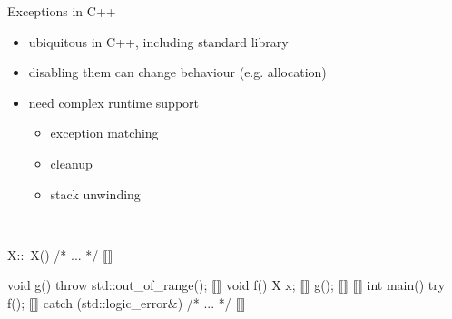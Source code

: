\documentclass[aspectratio=169, fi]{paradise-slide}
\begin{document}
\newcommand{\arr}[1]{\visible<#1>{\textcolor{red}{$\mathbf{\longleftarrow}$}}}
\begin{frame}[fragile]{Exceptions in C++}
  \begin{minipage}{0.47\textwidth}
    \setlength{\leftmargini}{1em}
    \begin{itemize}
      \item ubiquitous in C++, including standard library
      \item disabling them can change behaviour (e.g. allocation)
      \item need complex runtime support
        \begin{itemize}
          \item exception matching
          \item cleanup
          \item stack unwinding
        \end{itemize}
    \end{itemize}

    \bigskip
    \medskip\\
  \end{minipage}
  \hfill
  \pause
  \begin{minipage}{0.47\textwidth}
    \begin{cppcodeln}
      X::~X() { /* ... */ } ⟦\arr{7}⟧

      void g() {
        throw std::out_of_range(); ⟦\arr{5}⟧
      }
      void f() {
        X x; ⟦\arr{3}⟧
        g(); ⟦\arr{4}⟧
      } ⟦\arr{6}⟧
      int main() {
        try {
          f(); ⟦\arr{2}⟧
        } catch (std::logic_error&) {
          /* ... */ ⟦\arr{8}⟧
        }
      }
    \end{cppcodeln}
  \end{minipage}
\end{frame}
\end{document}

